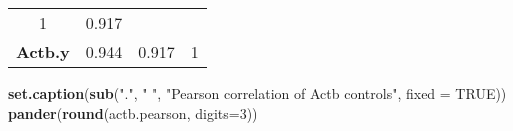 \documentclass[]{article}
\newenvironment{Shaded}{\begin{snugshade}}{\end{snugshade}}
\newcommand{\KeywordTok}[1]{\textcolor[rgb]{0.13,0.29,0.53}{\textbf{{#1}}}}
\newcommand{\DataTypeTok}[1]{\textcolor[rgb]{0.13,0.29,0.53}{{#1}}}
\newcommand{\DecValTok}[1]{\textcolor[rgb]{0.00,0.00,0.81}{{#1}}}
\newcommand{\StringTok}[1]{\textcolor[rgb]{0.31,0.60,0.02}{{#1}}}
\newcommand{\OtherTok}[1]{\textcolor[rgb]{0.56,0.35,0.01}{{#1}}}
\newcommand{\NormalTok}[1]{{#1}}
\begin{document}
\begin{longtable}[c]{@{}cccc@{}}
\begin{minipage}[t]{0.11\columnwidth}
1
\strut\end{minipage} &
\begin{minipage}[t]{0.11\columnwidth}\centering\strut
0.917
\strut\end{minipage}\tabularnewline
\begin{minipage}[t]{0.16\columnwidth}\centering\strut
\textbf{Actb.y}
\strut\end{minipage} &
\begin{minipage}[t]{0.09\columnwidth}\centering\strut
0.944
\strut\end{minipage} &
\begin{minipage}[t]{0.11\columnwidth}\centering\strut
0.917
\strut\end{minipage} &
\begin{minipage}[t]{0.11\columnwidth}\centering\strut
1
\strut\end{minipage}\tabularnewline
\bottomrule
\end{longtable}

\begin{Shaded}
\begin{Highlighting}[]
\KeywordTok{set.caption}\NormalTok{(}\KeywordTok{sub}\NormalTok{(}\StringTok{"."}\NormalTok{, }\StringTok{" "}\NormalTok{, }\StringTok{"Pearson correlation of Actb controls"}\NormalTok{, }\DataTypeTok{fixed =} \OtherTok{TRUE}\NormalTok{))}
\KeywordTok{pander}\NormalTok{(}\KeywordTok{round}\NormalTok{(actb.pearson, }\DataTypeTok{digits=}\DecValTok{3}\NormalTok{))}
\end{Highlighting}
\end{Shaded}
\end{document}

